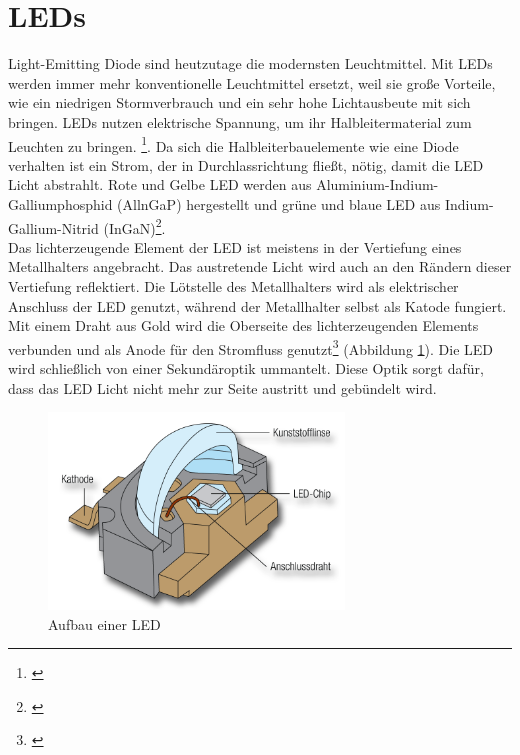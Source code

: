 \section{LEDs} \label{sec_led}
Light-Emitting Diode sind heutzutage die modernsten Leuchtmittel. Mit LEDs werden immer mehr konventionelle Leuchtmittel ersetzt, weil sie große Vorteile, wie ein niedrigen Stormverbrauch und ein sehr hohe Lichtausbeute mit sich bringen. LEDs nutzen elektrische Spannung, um ihr  Halbleitermaterial zum Leuchten zu bringen. \footnote{\cite[150]{mueller}}. Da sich die Halbleiterbauelemente wie eine Diode verhalten ist ein Strom, der in Durchlassrichtung fließt, nötig, damit die LED Licht abstrahlt. Rote und Gelbe LED werden aus Aluminium-Indium-Galliumphosphid (AllnGaP) hergestellt und grüne und blaue LED aus Indium-Gallium-Nitrid (InGaN)\footnote{\cite[153]{ris}}.\\
Das lichterzeugende Element der LED ist meistens in der Vertiefung eines Metallhalters angebracht. Das austretende Licht wird auch an den Rändern dieser Vertiefung reflektiert. Die Lötstelle des Metallhalters wird als elektrischer Anschluss der LED genutzt, während der Metallhalter selbst als Katode fungiert. Mit einem Draht aus Gold wird die Oberseite des lichterzeugenden Elements verbunden und als Anode für den Stromfluss genutzt\footnote{\cite[154]{ris}} (Abbildung \ref{b_led}). Die LED wird schließlich von einer Sekundäroptik ummantelt. Diese Optik sorgt dafür, dass das LED Licht nicht mehr zur Seite austritt und gebündelt wird.

\begin{figure}[htp]     %
\centering
\includegraphics[width=0.7\textwidth]{bilder/led} 
\caption {Aufbau einer LED\protect\footnotemark}\label{b_led}
\end{figure}


